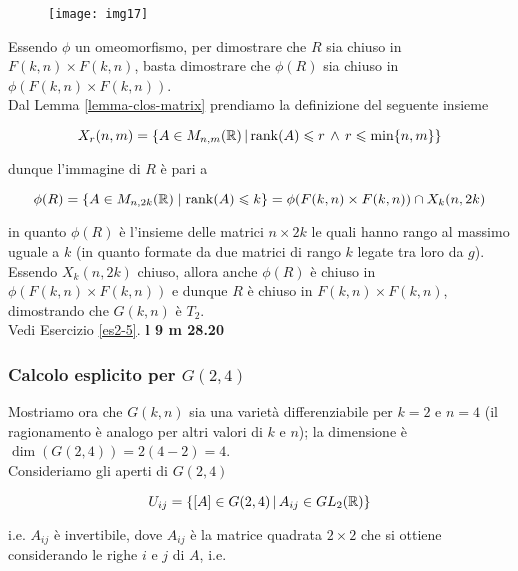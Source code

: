 \begin{figure}[H]
	\centering
	\texttt{[image: img17]}
\end{figure}

Essendo $ \phi $ un omeomorfismo, per dimostrare che $ R $ sia chiuso in $ F(k,n) \times F(k,n) $, basta dimostrare che $ \phi(R) $ sia chiuso in $ \phi(F(k,n) \times F(k,n)) $.\\
Dal Lemma \ref{lemma-clos-matrix} prendiamo la definizione del seguente insieme

\begin{equation}
	X_{r}(n,m) = \left\{ A \in M_{n,m}(\mathbb{R}) \, \middle| \, \rank(A) \leqslant r \, \wedge \, r \leqslant \min\{n,m\} \right\}
\end{equation}

dunque l'immagine di $ R $ è pari a

\begin{equation}
	\phi(R) = \{ A \in M_{n,2k}(\mathbb{R}) \mid \rank(A) \leqslant k \} = \phi(F(k,n) \times F(k,n)) \cap X_{k}(n,2k)
\end{equation}

in quanto $ \phi(R) $ è l'insieme delle matrici $ n \times 2k $ le quali hanno rango al massimo uguale a $ k $ (in quanto formate da due matrici di rango $ k $ legate tra loro da $ g $). Essendo $ X_{k}(n,2k) $ chiuso, allora anche $ \phi(R) $ è chiuso in $ \phi(F(k,n) \times F(k,n)) $ e dunque $ R $ è chiuso in $ F(k,n) \times F(k,n) $, dimostrando che $ G(k,n) $ è $ T_{2} $.\\
Vedi Esercizio \ref{es2-5}. \textbf{l 9 m 28.20}

\subsubsection{Calcolo esplicito per $ G(2,4) $}

Mostriamo ora che $ G(k,n) $ sia una varietà differenziabile per $ k=2 $ e $ n=4 $ (il ragionamento è analogo per altri valori di $ k $ e $ n $); la dimensione è $ \dim(G(2,4)) = 2(4-2) = 4 $.\\
Consideriamo gli aperti di $ G(2,4) $

\begin{equation}
	U_{ij} = \left\{ [A] \in G(2,4) \, \middle| \, A_{ij} \in GL_{2}(\mathbb{R}) \right\}
\end{equation}

i.e. $ A_{ij} $ è invertibile, dove $ A_{ij} $ è la matrice quadrata $ 2 \times 2 $ che si ottiene considerando le righe $ i $ e $ j $ di $ A $, i.e.

